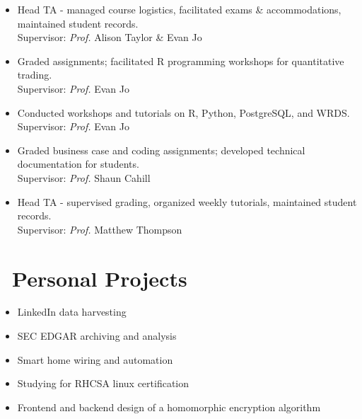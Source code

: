 \documentclass{resume}
\begin{document}
\begin{itemize}
  \item {}
  {Head TA - managed course logistics, facilitated exams \& accommodations, maintained student records.}\\
  {Supervisor: \emph{Prof.} Alison Taylor \& Evan Jo}\\
  \vspace{-0.5em}
  
  \item {}
  {Graded assignments; facilitated R programming workshops for quantitative trading. }\\
  {Supervisor: \emph{Prof.} Evan Jo}\\
  \vspace{-0.5em}
  
  \item {}
  {Conducted workshops and tutorials on R, Python, PostgreSQL, and WRDS.}\\
  {Supervisor: \emph{Prof.} Evan Jo}\\
  \vspace{-0.5em}
  
  \item {}
  {Graded business case and coding assignments; developed technical documentation for students.}\\
  {Supervisor: \emph{Prof.} Shaun Cahill}\\
  \vspace{-0.5em}
    
  \item {}
  {Head TA - supervised grading, organized weekly tutorials, maintained student records.}\\
  {Supervisor: \emph{Prof.} Matthew Thompson}\\
  \vspace{-0.5em}
  
\end{itemize}




\section{\faUser\ Personal Projects}
\begin{itemize}[parsep=0.5ex]
  \item LinkedIn data harvesting
  \item SEC EDGAR archiving and analysis
  \item Smart home wiring and automation
  \item Studying for RHCSA linux certification 
  \item Frontend and backend design of a homomorphic encryption algorithm
\end{itemize}
\end{document}
